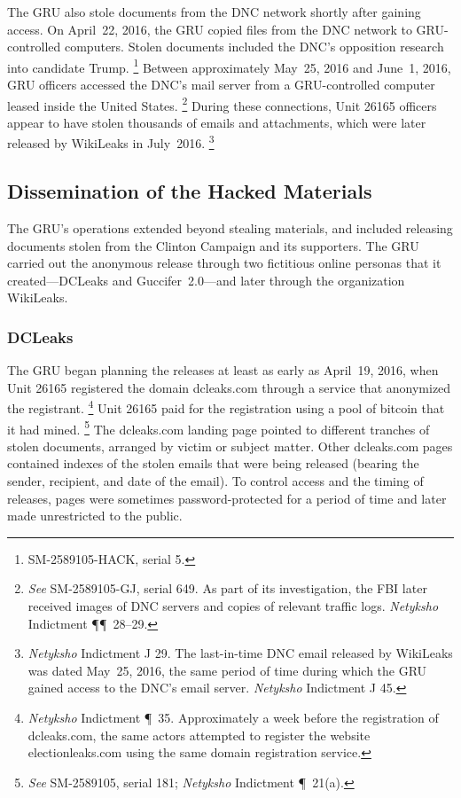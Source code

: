 The GRU also stole documents from the DNC network shortly after gaining access.
On April~22, 2016, the GRU copied files from the DNC network to GRU-controlled computers.
Stolen documents included the DNC's opposition research into candidate Trump.%
\footnote{ SM-2589105-HACK, serial 5.
}
Between approximately May~25, 2016 and June~1, 2016, GRU officers accessed the DNC's mail server from a  GRU-controlled computer leased inside the United States.%
\footnote{
\textit{See} SM-2589105-GJ, serial 649. As part of its investigation, the FBI later received images of DNC servers and copies of relevant traffic logs.
\textit{Netyksho} Indictment \P\P~28--29.}
During these connections, Unit 26165 officers appear to have stolen thousands of emails and attachments, which were later released by WikiLeaks in July~2016.%
\footnote{\textit{Netyksho} Indictment J 29.
The last-in-time DNC email released by WikiLeaks was dated May~25, 2016, the same period of time during which the GRU gained access to the DNC's email server.
\textit{Netyksho} Indictment J 45.}

\subsection{Dissemination of the Hacked Materials}

The GRU's operations extended beyond stealing materials, and included releasing documents stolen from the Clinton Campaign and its supporters.
The GRU carried out the anonymous release through two fictitious online personas that it created---DCLeaks and Guccifer~2.0---and later through the organization WikiLeaks.

\subsubsection{DCLeaks}

The GRU began planning the releases at least as early as April~19, 2016, when Unit 26165 registered the domain dcleaks.com through a service that anonymized the registrant.%
\footnote{\textit{Netyksho} Indictment \P~35.
Approximately a week before the registration of dcleaks.com, the same actors attempted to register the website electionleaks.com using the same domain registration service.
}
Unit 26165 paid for the registration using a pool of bitcoin that it had mined.%
\footnote{\textit{See} SM-2589105, serial 181;
\textit{Netyksho} Indictment \P~21(a).}
The dcleaks.com landing page pointed to different tranches of stolen documents, arranged by victim or subject matter.
Other dcleaks.com pages contained indexes of the stolen emails that were being released (bearing the sender, recipient, and date of the email).
To control access and the timing of releases, pages were sometimes password-protected for a period of time and later made unrestricted to the public.

